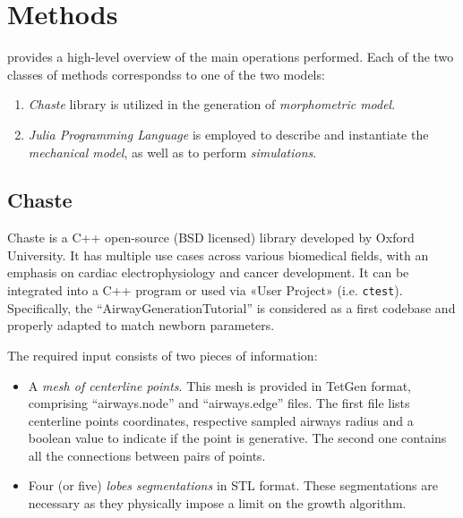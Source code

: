 
\section{Methods}


 provides a high-level overview of the main
operations performed.  Each of the two classes of methods correspondss
to one of the two models:

\begin{enumerate}
\item \emph{Chaste} library is utilized in the generation of
  \emph{morphometric model}.
\item \emph{Julia Programming Language} is employed to describe and
  instantiate the \emph{mechanical model}, as well as to perform
  \emph{simulations}.
\end{enumerate}



\subsection{Chaste}
\label{subsec:chaste}

Chaste is a C++ open-source (BSD licensed) library developed by Oxford
University.  It has multiple use cases across various biomedical
fields, with an emphasis on cardiac electrophysiology and cancer
development\cite{mirams2013}.  It can be integrated into a C++ program
or used via «User Project» (i.e. \texttt{ctest}).
Specifically, the ``AirwayGenerationTutorial'' is considered as a
first codebase and properly adapted to match newborn
parameters\cite{airwaygeneration2024}.

The required input consists of two pieces of information:
\begin{itemize}
\item A \emph{mesh of centerline points}.  This mesh is provided in
  TetGen format, comprising ``airways.node'' and ``airways.edge''
  files. The first file lists centerline points coordinates,
  respective sampled airways radius and a boolean value to indicate if
  the point is generative. The second one contains all the connections
  between pairs of points.
\item Four (or five) \emph{lobes segmentations} in STL format.  These
  segmentations are necessary as they physically impose a limit on the
  growth algorithm.
\end{itemize}

